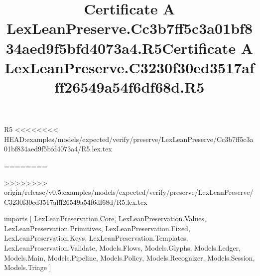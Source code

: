 \begin{lexlean}{R5}
<<<<<<<< HEAD:examples/models/expected/verify/preserve/LexLeanPreserve/Cc3b7ff5c3a01bf834aed9f5bfd4073a4/R5.lex.tex
\title{Certificate A LexLeanPreserve.Cc3b7ff5c3a01bf834aed9f5bfd4073a4.R5}
========
\title{Certificate A LexLeanPreserve.C3230f30ed3517afff26549a54f6df68d.R5}
>>>>>>>> origin/release/v0.5:examples/models/expected/verify/preserve/LexLeanPreserve/C3230f30ed3517afff26549a54f6df68d/R5.lex.tex
\begin{coremodule}
imports [
  LexLeanPreservation.Core,
  LexLeanPreservation.Values,
  LexLeanPreservation.Primitives,
  LexLeanPreservation.Fixed,
  LexLeanPreservation.Keys,
  LexLeanPreservation.Templates,
  LexLeanPreservation.Validate,
  Models.Flows,
  Models.Glyphs,
  Models.Ledger,
  Models.Main,
  Models.Pipeline,
  Models.Policy,
  Models.Recognizer,
  Models.Session,
  Models.Triage
]


\end{coremodule}
\end{lexlean}
